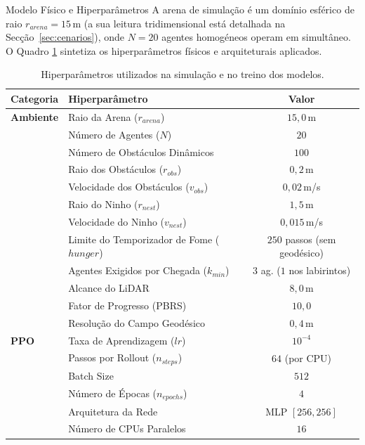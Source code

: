 \documentclass[12pt,reqno, twoside]{amsbook}
\makeatletter
\def\subsection{\@startsection{subsection}{2}%
      \z@{.5\linespacing\@plus.7\linespacing}{.25\linespacing}%
      {\normalfont\bfseries\flushleft}}
\theoremstyle{plain}
\numberwithin{equation}{chapter}
\numberwithin{section}{chapter}
\numberwithin{table}{chapter}
\numberwithin{figure}{chapter}
\makeatother
\begin{document}
\subsection{Modelo Físico e Hiperparâmetros}
A arena de simulação é um domínio esférico de raio $r_{arena} = 15$\,m (a sua leitura tridimensional está detalhada na Secção~\ref{sec:cenarios}), onde $N = 20$ agentes homogéneos operam em simultâneo. O Quadro \ref{tab:hyperparameters} sintetiza os hiperparâmetros físicos e arquiteturais aplicados.

\begin{table}[!htbp]
\centering
\footnotesize
\caption[Hiperparâmetros da simulação e do treino]{Hiperparâmetros utilizados na simulação e no treino dos modelos.}
\label{tab:hyperparameters}
\renewcommand{\arraystretch}{1.2}
\begin{tabular}{|l|l|c|}
\hline
\textbf{Categoria} & \textbf{Hiperparâmetro} & \textbf{Valor} \\ \hline
\textbf{Ambiente} & Raio da Arena ($r_{arena}$) & $15{,}0$\,m \\
 & Número de Agentes ($N$) & $20$ \\
 & Número de Obstáculos Dinâmicos & $100$ \\
 & Raio dos Obstáculos ($r_{obs}$) & $0{,}2$\,m \\
 & Velocidade dos Obstáculos ($v_{obs}$) & $0{,}02$\,m/s \\
 & Raio do Ninho ($r_{nest}$) & $1{,}5$\,m \\
 & Velocidade do Ninho ($v_{nest}$) & $0{,}015$\,m/s \\
 & Limite do Temporizador de Fome ($hunger$) & $250$ passos (sem geodésico) \\
 & Agentes Exigidos por Chegada ($k_{min}$) & $3$ ag. ($1$ nos labirintos) \\
 & Alcance do LiDAR & $8{,}0$\,m \\
 & Fator de Progresso (PBRS) & $10{,}0$ \\
 & Resolução do Campo Geodésico & $0{,}4$\,m \\ \hline
\textbf{PPO} & Taxa de Aprendizagem ($lr$) & $10^{-4}$ \\
 & Passos por Rollout ($n_{steps}$) & $64$ (por CPU) \\
 & Batch Size & $512$ \\
 & Número de Épocas ($n_{epochs}$) & $4$ \\
 & Arquitetura da Rede & MLP $[256, 256]$ \\
 & Número de CPUs Paralelos & $16$ \\ \hline

\end{tabular}
\end{table}
\end{document}

